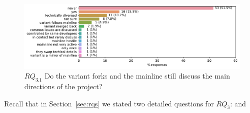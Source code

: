 \begin{figure}[ht]
\begin{center}
    \centering
    \includegraphics[width=\columnwidth]{pdfs/discussions_rq3_colored.pdf}
    \caption{$RQ_{3.1}$ Do the variant forks and the mainline still discuss the main directions of the project?}
    \label{fig:discussions}
\end{center}
\vspace{-.3cm}
\end{figure}

\nd \textbf{\rqThree}
Recall that in Section~\ref{sec:rqs} we stated two detailed questions for $RQ_{3}$: \textit{\rqThreeOne} and \textit{\rqThreeTwo}

